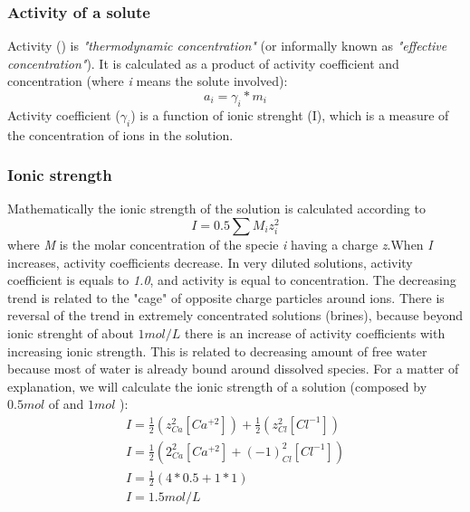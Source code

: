

\subsubsection{Activity of a solute}
Activity () is \emph{"thermodynamic concentration"} (or informally known as \emph{"effective concentration"}). It is calculated as a product of activity coefficient and concentration (where \emph{i} means the solute involved):
\begin{equation}\label{activityEq}
a_i = \gamma_i * m_i
\end{equation}
Activity coefficient ($\gamma_i$) is a function of ionic strenght (I), which is a measure of the concentration of ions in the solution.  

\subsubsection{Ionic strength}
Mathematically the ionic strength of the solution is calculated according to
\begin{equation} \label{eq:ionicStrength}
I = 0.5 \sum{M_i z_i^2}
\end{equation}
where \emph{M} is the molar concentration of the specie \emph{i} having a charge \emph{z}.When \emph{I} increases, activity coefficients decrease. In very diluted solutions, activity coefficient is equals to \emph{1.0}, and activity is equal to concentration. The decreasing trend is related to the "cage" of opposite charge particles around ions. There is reversal of the trend in extremely concentrated solutions (brines), because beyond ionic strenght of about $1 mol/L$ there is an increase of activity coefficients with increasing ionic strength. This is related to decreasing amount of free water because most of water is already bound around dissolved species.
For a matter of explanation, we will calculate the ionic strength of a  solution (composed by $0.5 mol$ of  and $1 mol$ ):
\begin{eqnarray}
I = \frac{1}{2}  (z^2_{Ca}[Ca^{+2}]) + \frac{1}{2}  (z^2_{Cl}[Cl^{-1}]) \\
I = \frac{1}{2}  (2^2_{Ca}[Ca^{+2}] +  (-1)^2_{Cl}[Cl^{-1}]) \\
I = \frac{1}{2} (4 * 0.5 + 1 * 1) \\
I = 1.5 mol/L
\end{eqnarray}


